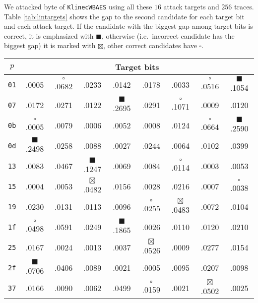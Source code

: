We attacked  byte of {\tt KlinecWBAES} using all these $16$ attack targets and $256$ traces. Table \ref{tab:lintargets} shows the gap to the second candidate for each target bit and each attack target. If the candidate with the biggest gap among target bits is correct, it is emphasized with $\blacksquare$, otherwise (i.e.\ incorrect candidate has the biggest gap) it is marked with $\boxtimes$, other correct candidates have $\square$.

\begin{table}[h]
	\begin{center}
	\begin{tabular}{| c | c | c | c | c | c | c | c | c |}
		\hline
		$p$ & \multicolumn{8}{c|}{Target bits} \\
		\hline
		{\tt 01}&\quad .0005&$\square$ .0682&\quad .0233&\quad .0142&\quad .0178&\quad .0033&$\square$ .0516&$\blacksquare$ .1054 \\
		\hline
		{\tt 07}&\quad .0172&\quad .0271&\quad .0122&$\blacksquare$ .2695&\quad .0291&$\square$ .1071&\quad .0009&\quad .0120 \\
		\hline
		{\tt 0b}&$\square$ .0005&\quad .0079&\quad .0006&\quad .0052&\quad .0008&\quad .0124&$\square$ .0664&$\blacksquare$ .2590 \\
		\hline
		{\tt 0d}&$\blacksquare$ .2498&\quad .0258&\quad .0088&\quad .0027&\quad .0244&\quad .0064&\quad .0102&\quad .0399 \\
		\hline
		{\tt 13}&\quad .0083&\quad .0467&$\blacksquare$ .1247&\quad .0069&\quad .0084&$\square$ .0114&\quad .0003&\quad .0053 \\
		\hline
		{\tt 15}&\quad .0004&\quad .0053&$\boxtimes$ .0482&\quad .0156&\quad .0028&\quad .0216&\quad .0007&$\square$ .0038 \\
		\hline
		{\tt 19}&\quad .0230&\quad .0131&\quad .0113&\quad .0096&$\square$ .0255&$\boxtimes$ .0483&\quad .0072&\quad .0104 \\
		\hline
		{\tt 1f}&$\square$ .0498&\quad .0591&\quad .0249&$\blacksquare$ .1865&\quad .0026&\quad .0110&\quad .0120&\quad .0210 \\
		\hline
		{\tt 25}&\quad .0167&\quad .0024&\quad .0013&\quad .0037&$\boxtimes$ .0526&\quad .0009&\quad .0277&\quad .0154 \\
		\hline
		{\tt 2f}&$\blacksquare$ .0706&\quad .0406&\quad .0089&\quad .0021&\quad .0005&\quad .0095&\quad .0207&\quad .0098 \\
		\hline
		{\tt 37}&\quad .0166&\quad .0090&\quad .0062&\quad .0499&$\square$ .0159&\quad .0021&$\boxtimes$ .0502&\quad .0025 \\

\end{tabular}
\end{center}
\end{table}
